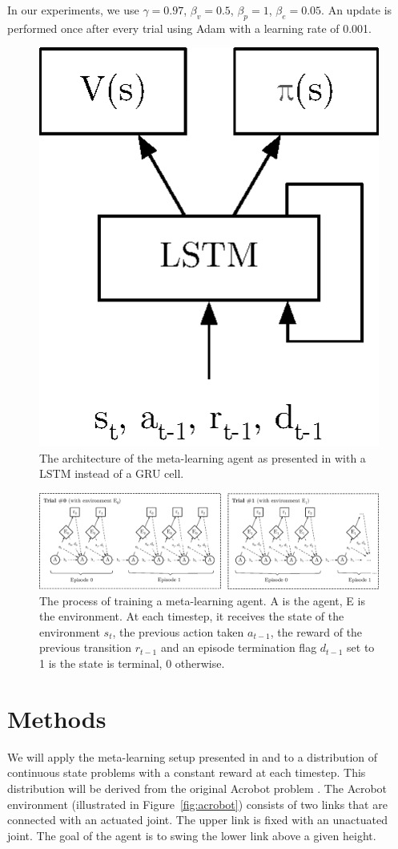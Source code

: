\documentclass[letterpaper]{article}
\begin{document}
In our experiments, we use $\gamma = 0.97$, $\beta_v = 0.5$, $\beta_p = 1$, 
$\beta_e = 0.05$. An update is performed
once after every trial using Adam \citep{adam} with a learning rate of 0.001.\\


\begin{figure}[h]
	\centering
	\includegraphics[width=.4\linewidth]{fig/a2c_meta.eps}
	\caption{The architecture of the meta-learning agent as presented in
	\cite{learningtorl} with a LSTM instead of a GRU cell.}
	\label{fig:a2c}
\end{figure}


\begin{figure}[h]
	\centering
	\includegraphics[width=\textwidth]{fig/meta_learning_process.eps}
	\caption{The process of training a meta-learning agent. 
	A is the agent, E is the environment. At each
	timestep, it receives the state of the environment $s_t$, 
	the previous action taken $a_{t-1}$, the reward of the previous
	transition $r_{t-1}$ and an episode termination flag $d_{t-1}$ set to 1 is the
	state is terminal, 0 otherwise.}
	\label{fig:meta_learning_process}
\end{figure}


\section{Methods}
We will apply the meta-learning setup presented in \cite{learningtorl} and
\cite{fastrlviaslowrl} to a distribution of continuous state problems with a 
constant reward at each timestep. This distribution will be derived from
the original Acrobot problem \citep{acrobot1996, acrobot2015}. The Acrobot
environment (illustrated in Figure~\ref{fig:acrobot}) consists of two links 
that are connected with an actuated joint. The upper link is fixed with an 
unactuated joint. The goal of the agent is to swing the lower link above a 
given height.
\end{document}
